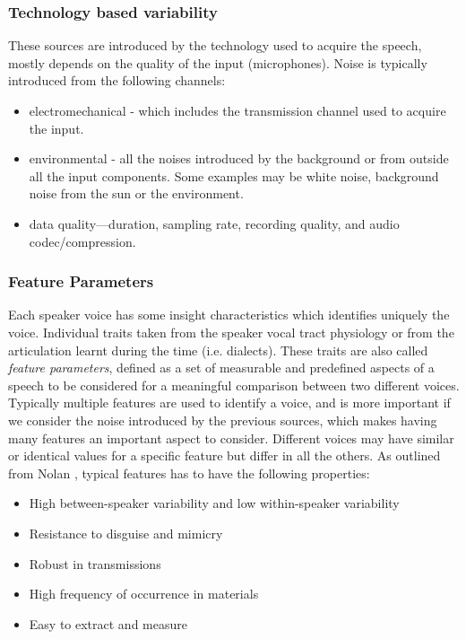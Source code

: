 \subsubsection{Technology based variability}
These sources are introduced by the technology used to acquire
the speech, mostly depends on the quality of the input (microphones).
Noise is typically introduced from the following channels:

\begin{itemize}
    \item electromechanical - which includes the
    transmission channel used to acquire the input.
    \item environmental - all the noises introduced by the background or from
    outside all the input components. Some examples may be white noise, background noise
    from the sun or the environment.
    \item data quality—duration, sampling rate, recording quality, and audio codec/compression.
\end{itemize}

\subsubsection{Feature Parameters}
Each speaker voice has some insight characteristics which identifies uniquely
the voice. Individual traits taken from the speaker vocal tract physiology or
from the articulation learnt during the time (i.e. dialects).
These traits are also called \textit{feature parameters}, defined as a set
of measurable and predefined aspects of a speech to be considered for a meaningful
comparison between two different voices. Typically multiple features
are used to identify a voice, and is more important if we consider the noise introduced by
the previous sources, which makes having many features an important aspect to consider.
Different voices may have similar or identical values for a specific feature but differ in all
the others.
As outlined from Nolan \cite{phonetic}, typical features has to have the following properties:
\begin{itemize}
    \item High between-speaker variability and low within-speaker variability
    \item Resistance to disguise and mimicry
    \item Robust in transmissions
    \item High frequency of occurrence in materials
    \item Easy to extract and measure

\end{itemize}

